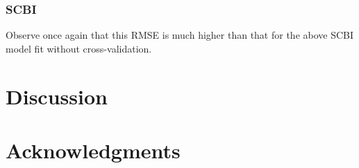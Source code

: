 \documentclass[12pt]{article}
\newenvironment{Shaded}{\begin{snugshade}}{\end{snugshade}}
\newcommand{\DataTypeTok}[1]{\textcolor[rgb]{0.13,0.29,0.53}{#1}}
\newcommand{\KeywordTok}[1]{\textcolor[rgb]{0.13,0.29,0.53}{\textbf{#1}}}
\newcommand{\NormalTok}[1]{#1}
\newcommand{\OperatorTok}[1]{\textcolor[rgb]{0.81,0.36,0.00}{\textbf{#1}}}
\newcommand{\StringTok}[1]{\textcolor[rgb]{0.31,0.60,0.02}{#1}}
\begin{document}
\hypertarget{scbi-2}{%
\subsubsection{SCBI}\label{scbi-2}}

Observe once again that this RMSE is much higher than that for the above
SCBI model fit without cross-validation.

\begin{Shaded}
\end{Shaded}

\hypertarget{discussion}{%
\section{Discussion}\label{discussion}}

\hypertarget{acknowledgments}{%
\section{Acknowledgments}\label{acknowledgments}}



\end{document}
